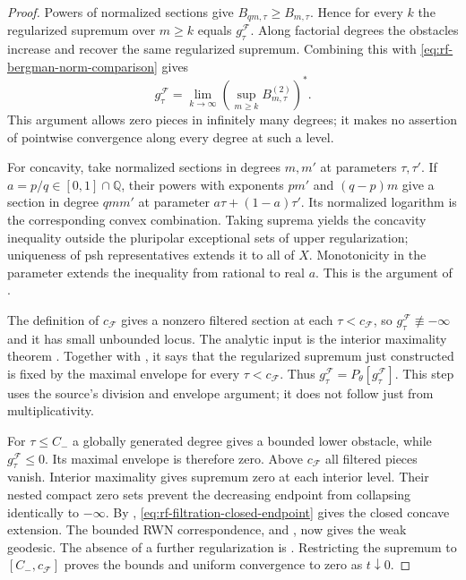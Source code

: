 \begin{proof}
Powers of normalized sections give $B_{qm,\tau}\geq B_{m,\tau}$. Hence for every $k$ the regularized supremum over $m\geq k$ equals $g_\tau^{\mathcal F}$. Along factorial degrees the obstacles increase and recover the same regularized supremum. Combining this with \eqref{eq:rf-bergman-norm-comparison} gives
\[
 g_\tau^{\mathcal F}
 =\lim_{k\to\infty}\left(\sup_{m\geq k}B^{(2)}_{m,\tau}\right)^*.
\tag{65.16a}\label{eq:rf-partial-bergman-tail}
\]
This argument allows zero pieces in infinitely many degrees; it makes no assertion of pointwise convergence along every degree at such a level.

For concavity, take normalized sections in degrees $m,m'$ at parameters $\tau,\tau'$. If $a=p/q\in[0,1]\cap\mathbb Q$, their powers with exponents $pm'$ and $(q-p)m$ give a section in degree $qmm'$ at parameter $a\tau+(1-a)\tau'$. Its normalized logarithm is the corresponding convex combination. Taking suprema yields the concavity inequality outside the pluripolar exceptional sets of upper regularization; uniqueness of psh representatives extends it to all of $X$. Monotonicity in the parameter extends the inequality from rational to real $a$. This is the argument of \cite[Proposition~7.7]{RWN14}.

The definition of $c_{\mathcal F}$ gives a nonzero filtered section at each $\tau<c_{\mathcal F}$, so $g_\tau^{\mathcal F}\not\equiv-\infty$ and it has small unbounded locus. The analytic input is the interior maximality theorem \cite[Proposition~7.11 and Corollary~7.12]{RWN14}. Together with \cite[proof of Proposition~6.10, equation~(6.6)]{RWN14}, it says that the regularized supremum just constructed is fixed by the maximal envelope for every $\tau<c_{\mathcal F}$. Thus $g_\tau^{\mathcal F}=P_\theta[g_\tau^{\mathcal F}]$. This step uses the source's division and envelope argument; it does not follow just from multiplicativity.

For $\tau\leq C_-$ a globally generated degree gives a bounded lower obstacle, while $g_\tau^{\mathcal F}\leq0$. Its maximal envelope is therefore zero. Above $c_{\mathcal F}$ all filtered pieces vanish. Interior maximality gives supremum zero at each interior level. Their nested compact zero sets prevent the decreasing endpoint from collapsing identically to $-\infty$. By , \eqref{eq:rf-filtration-closed-endpoint} gives the closed concave extension. The bounded RWN correspondence, \cite[Corollary~7.12]{RWN14} and , now gives the weak geodesic. The absence of a further regularization is . Restricting the supremum to $[C_-,c_{\mathcal F}]$ proves the bounds and uniform convergence to zero as $t\downarrow0$.
\end{proof}

